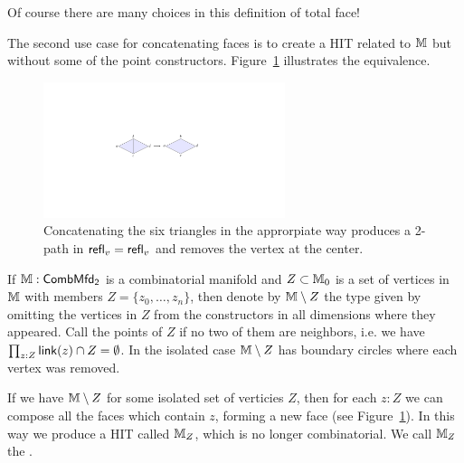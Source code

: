 Of course there are many choices in this definition of total face!

The second use case for concatenating faces is to create a HIT related to \( \mathbb{M} \) but without some of the point constructors. Figure~\ref{fig:hex_concat} illustrates the equivalence.
\begin{figure}[htbp]
\centering
\includegraphics[width=200pt]{hex_concat.pdf}
\caption{Concatenating the six triangles in the approrpiate way produces a 2-path in \( \mathsf{refl}_v=\mathsf{refl}_v \) and removes the vertex at the center.}
\label{fig:hex_concat}
\end{figure}

\begin{mydef}
If \( \mathbb{M}:\mathsf{CombMfd_2} \) is a combinatorial manifold and \( Z\subset \mathbb{M}_0 \) is a set of vertices in \( \mathbb{M} \) with members \( Z=\{z_0,\ldots,z_n\} \), then denote by \( \mathbb{M}\setminus Z \) the type given by omitting the vertices in \( Z \) from the constructors in all dimensions where they appeared. Call the points of \( Z \)  if no two of them are neighbors, i.e. we have \( \prod_{z:Z}\operatorname{\mathsf{link}}(z)\cap Z=\emptyset \). In the isolated case \( \mathbb{M}\setminus Z \) has boundary circles where each vertex was removed.
\end{mydef}

\begin{mydef}
\label{def:replacement}
If we have \( \mathbb{M}\setminus Z \) for some isolated set of verticies \( Z \), then for each \( z:Z \) we can compose all the faces which contain \( z \), forming a new face (see Figure~\ref{fig:hex_concat}). In this way we produce a HIT called \( \mathbb{M}_Z \), which is no longer combinatorial. We call \( \mathbb{M}_Z \) the .
\end{mydef}


